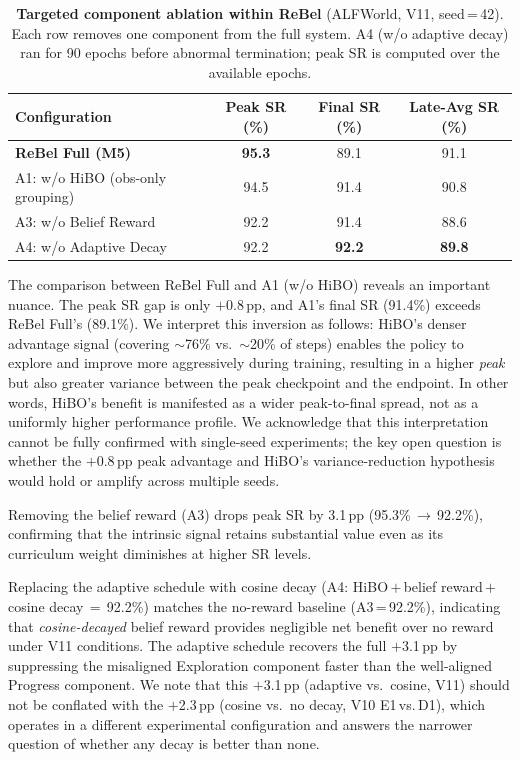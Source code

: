 \begin{table}[t]
  \centering
  \caption{%
    \textbf{Targeted component ablation within ReBel} (ALFWorld, V11, seed\,=\,42).
    Each row removes one component from the full system.
    A4 (w/o adaptive decay) ran for 90 epochs before abnormal termination;
    peak SR is computed over the available epochs.
  }
  \label{tab:ablation_v11}
  \vspace{4pt}
  \small
  \renewcommand{\arraystretch}{1.15}
  \begin{tabular}{@{}lccc@{}}
    \toprule
    \textbf{Configuration}
      & \textbf{Peak SR (\%)}
      & \textbf{Final SR (\%)}
      & \textbf{Late-Avg SR (\%)} \\
    \midrule
    \textbf{ReBel Full (M5)}         & \textbf{95.3} & 89.1          & 91.1          \\
    A1: w/o HiBO (obs-only grouping) & 94.5          & 91.4          & 90.8          \\
    A3: w/o Belief Reward            & 92.2          & 91.4          & 88.6          \\
    A4: w/o Adaptive Decay           & 92.2          & \textbf{92.2} & \textbf{89.8} \\
    \bottomrule
  \end{tabular}
\end{table}

The comparison between ReBel Full and A1 (w/o HiBO) reveals an important nuance.
The peak SR gap is only $+$0.8\,pp, and A1's final SR (91.4\%) exceeds
ReBel Full's (89.1\%).
We interpret this inversion as follows: HiBO's denser advantage signal (covering
$\sim$76\% vs.\ $\sim$20\% of steps) enables the policy to explore and improve
more aggressively during training, resulting in a higher \emph{peak} but also
greater variance between the peak checkpoint and the endpoint.
In other words, HiBO's benefit is manifested as a wider peak-to-final spread,
not as a uniformly higher performance profile.
We acknowledge that this interpretation cannot be fully confirmed with
single-seed experiments; the key open question is whether the $+$0.8\,pp peak
advantage and HiBO's variance-reduction hypothesis would hold or amplify
across multiple seeds.

Removing the belief reward (A3) drops peak SR by 3.1\,pp (95.3\%\,$\to$\,92.2\%),
confirming that the intrinsic signal retains substantial value even as its
curriculum weight diminishes at higher SR levels.

Replacing the adaptive schedule with cosine decay (A4: HiBO\,$+$\,belief
reward\,$+$\,cosine decay\,$=$\,92.2\%) matches the no-reward baseline (A3\,=\,92.2\%),
indicating that \emph{cosine-decayed} belief reward provides negligible net benefit
over no reward under V11 conditions.
The adaptive schedule recovers the full $+$3.1\,pp by suppressing the misaligned
Exploration component faster than the well-aligned Progress component.
We note that this $+$3.1\,pp (adaptive vs.\ cosine, V11) should not be conflated
with the $+$2.3\,pp (cosine vs.\ no decay, V10 E1\,vs.\,D1), which operates in a
different experimental configuration and answers the narrower question of whether
any decay is better than none.

